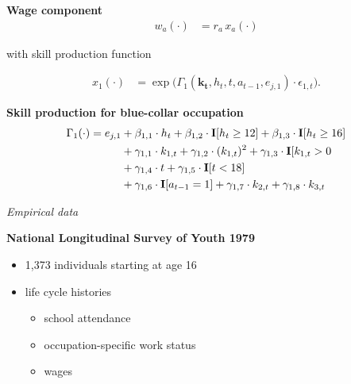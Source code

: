 \begin{frame}\textbf{Wage component}\vspace{0.3cm}
%
\begin{align*}
w_{a}(\cdot) & = r_{a} \, x_{a}(\cdot)
\end{align*}

with skill production function

\begin{align*}
x_{1}(\cdot) & = \exp \big( \Gamma_{1}(\bm{k_t},  h_t, t, a_{t-1}, e_{j,1}) \cdot \epsilon_{1,t} \big).
\end{align*}
\end{frame}
\begin{frame}\textbf{Skill production for blue-collar occupation}\vspace{0.3cm}
%
\begin{align*}
     \Gamma_1(\cdot) = e_{j,1} & + \beta_{1,1} \cdot h_t + \beta_{1, 2} \cdot {\textbf{I}}[h_t \geq 12] + \beta_{1,3} \cdot {\textbf{I}}[h_t\geq 16]\\
                                   & + \gamma_{1, 1} \cdot  k_{1,t} + \gamma_{1,2} \cdot  (k_{1,t})^2 + \gamma_{1,3} \cdot  {\textbf{I}}[k_{1,t} > 0 \\
                                 & + \gamma_{1,4} \cdot  t + \gamma_{1,5} \cdot {\textbf{I}}[t < 18]\\
                                   & + \gamma_{1,6} \cdot {\textbf{I}}[a_{t-1} = 1] + \gamma_{1,7} \cdot  k_{2,t} + \gamma_{1,8} \cdot  k_{3,t}
\end{align*}
%
\end{frame}
\begin{frame}\begin{center}
		\LARGE\textit{Empirical data}
\end{center}\end{frame}
\begin{frame}\textbf{National Longitudinal Survey of Youth 1979}\vspace{0.3cm}

\begin{itemize}\setlength\itemsep{1em}
\item 1,373 individuals starting at age 16
\item life cycle histories \medskip
\begin{itemize}\setlength\itemsep{1em}
\item school attendance
\item occupation-specific work status
\item wages
\end{itemize}
\end{itemize}
\end{frame}
